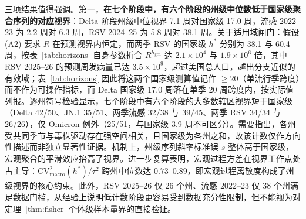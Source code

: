 \documentclass[11pt,a4paper]{article}
\theoremstyle{plain}
\theoremstyle{definition}
\begin{document}
三项结果值得强调。第一，\textbf{在七个阶段中，有六个阶段的州级中位数低于国家级聚合序列的对应视界}：Delta 阶段州级中位视界 7.1 周对国家级 17.0 周，流感 2022--23 为 2.2 周对 6.3 周，RSV 2024--25 为 5.8 周对 38.1 周。关于适用域闸门：假设 (A2) 要求 $R$ 在预测视界内恒定，而两季 RSV 的国家级 $h^*$ 分别为 38.1 与 60.4 周，按表~\ref{tab:horizons} 自身参数折合 $R^{h_{\text{gen}}}$ 达 $2.1\times10^4$ 与 $1.9\times10^6$ 倍，其中 RSV 2025--26 的预测周发病量已达 $3.5\times10^9$，超过美国总人口，越出分支近似的有效域；表~\ref{tab:horizons} 因此将这两个国家级测算值记作 $\ge 20$（单流行季跨度）而不作为可操作指标，而 Delta 国家级 17.0 周落在单季 20 周跨度内，按实际值列报。逐州符号检验显示，七个阶段中有六个阶段的大多数辖区视界短于国家级（Delta 42/50、JN.1 35/51、两季流感 32/38 与 39/45、两季 RSV 34/34 与 26/26），仅 Omicron 例外（25/51，与国家级 3.9 周不可区分）。需要指出，各州受共同季节与毒株驱动存在强空间相关，且国家级为各州之和，故该计数仅作方向性描述而非独立显著性证据。机制上，州级序列斜率标准误 $s$ 整体高于国家级，宏观聚合的平滑效应抬高了视界。进一步复算表明，宏观过程方差在视界工作点处占主导：$\text{CV}^2_{\text{macro}}(h^*)/\tau^2$ 跨州中位数达 $0.73$--$0.89$，即宏观过程离散度构成了州级视界的核心约束。此外，RSV 2025--26 仅 26 个州、流感 2022--23 仅 38 个州满足数据门槛，从经验上说明低计数阶段更容易受到数据充分性限制，但不能视为对定理~\ref{thm:fisher} 个体级样本量界的直接验证。
\end{document}
